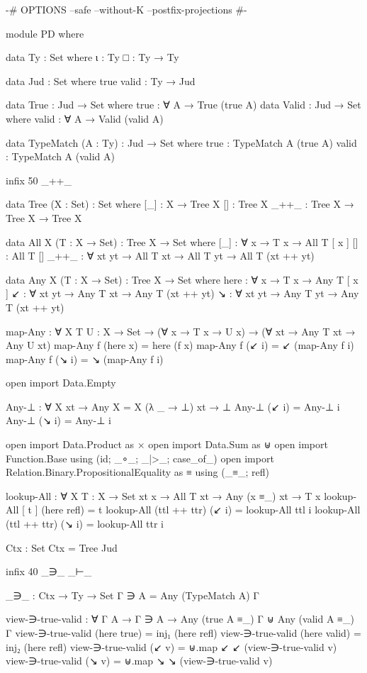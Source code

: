 \begin{code}
{-# OPTIONS --safe --without-K --postfix-projections #-}

module PD where

  data Ty : Set where
    ι : Ty
    □ : Ty → Ty

  data Jud : Set where
    true valid : Ty → Jud

  data True : Jud → Set where
    true : ∀ {A} → True (true A)
  data Valid : Jud → Set where
    valid : ∀ {A} → Valid (valid A)

  data TypeMatch (A : Ty) : Jud → Set where
    true : TypeMatch A (true A)
    valid : TypeMatch A (valid A)

  infix 50 _++_

  data Tree (X : Set) : Set where
    [_] : X → Tree X
    [] : Tree X
    _++_ : Tree X → Tree X → Tree X

  data All {X} (T : X → Set) : Tree X → Set where
    [_] : ∀ {x} → T x → All T [ x ]
    [] : All T []
    _++_ : ∀ {xt yt} → All T xt → All T yt → All T (xt ++ yt)

  data Any {X} (T : X → Set) : Tree X → Set where
    here : ∀ {x} → T x → Any T [ x ]
    ↙ : ∀ {xt yt} → Any T xt → Any T (xt ++ yt)
    ↘ : ∀ {xt yt} → Any T yt → Any T (xt ++ yt)

  map-Any : ∀ {X} {T U : X → Set} →
    (∀ {x} → T x → U x) → (∀ {xt} → Any T xt → Any U xt)
  map-Any f (here x) = here (f x)
  map-Any f (↙ i) = ↙ (map-Any f i)
  map-Any f (↘ i) = ↘ (map-Any f i)

  open import Data.Empty

  Any-⊥ : ∀ {X xt} → Any {X = X} (λ _ → ⊥) xt → ⊥
  Any-⊥ (↙ i) = Any-⊥ i
  Any-⊥ (↘ i) = Any-⊥ i

  open import Data.Product as ×
  open import Data.Sum as ⊎
  open import Function.Base using (id; _∘_; _|>_; case_of_)
  open import Relation.Binary.PropositionalEquality as ≡ using (_≡_; refl)

  lookup-All : ∀ {X} {T : X → Set} {xt x} → All T xt → Any (x ≡_) xt → T x
  lookup-All [ t ] (here refl) = t
  lookup-All (ttl ++ ttr) (↙ i) = lookup-All ttl i
  lookup-All (ttl ++ ttr) (↘ i) = lookup-All ttr i

  Ctx : Set
  Ctx = Tree Jud

  infix 40 _∋_ _⊢_

  _∋_ : Ctx → Ty → Set
  Γ ∋ A = Any (TypeMatch A) Γ

  view-∋-true-valid : ∀ {Γ A} → Γ ∋ A → Any (true A ≡_) Γ ⊎ Any (valid A ≡_) Γ
  view-∋-true-valid (here true) = inj₁ (here refl)
  view-∋-true-valid (here valid) = inj₂ (here refl)
  view-∋-true-valid (↙ v) = ⊎.map ↙ ↙ (view-∋-true-valid v)
  view-∋-true-valid (↘ v) = ⊎.map ↘ ↘ (view-∋-true-valid v)


\end{code}
